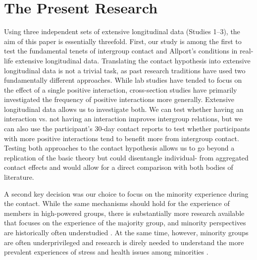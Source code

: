 \documentclass[man, 12pt, a4paper, mask]{apa7}
\theoremstyle{break}
\theoremstyle{plain}
\begin{document}
\section{The Present Research}
Using three independent sets of extensive longitudinal data (Studies 1–3), the aim of this paper is essentially threefold. First, our study is among the first to test the fundamental tenets of intergroup contact and Allport's conditions in real-life extensive longitudinal data. Translating the contact hypothesis into extensive longitudinal data is not a trivial task, as past research traditions have used two fundamentally different approaches. While lab studies have tended to focus on the effect of a single positive interaction, cross-section studies have primarily investigated the frequency of positive interactions more generally. Extensive longitudinal data allows us to investigate both. We can test whether having an interaction vs. not having an interaction improves intergroup relations, but we can also use the participant's 30-day contact reports to test whether participants with more positive interactions tend to benefit more from intergroup contact. Testing both approaches to the contact hypothesis allows us to go beyond a replication of the basic theory but could disentangle individual- from aggregated contact effects and would allow for a direct comparison with both bodies of literature. 

A second key decision was our choice to focus on the minority experience during the contact. While the same mechanisms should hold for the experience of members in high-powered groups, there is substantially more research available that focuses on the experience of the majority group, and minority perspectives are historically often understudied \citep[e.g.,][]{Dovidio2017}. At the same time, however, minority groups are often underprivileged and research is direly needed to understand the more prevalent experiences of stress and health issues among minorities \citep[e.g.,][]{alvidrez2019}. 
\end{document}
